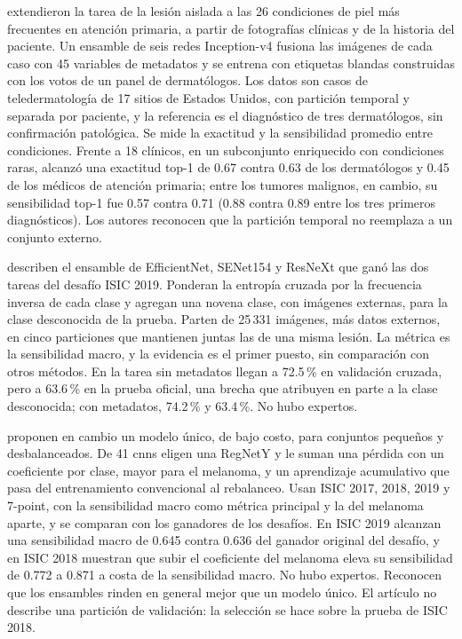 \textcite{liu2020deep} extendieron la tarea de la lesión aislada a las 26 condiciones de piel más frecuentes en
atención primaria, a partir de fotografías clínicas y de la historia del paciente. Un ensamble de seis redes
Inception-v4 fusiona las imágenes de cada caso con 45 variables de metadatos y se entrena con etiquetas blandas
construidas con los votos de un panel de dermatólogos. Los datos son casos de teledermatología de 17 sitios de
Estados Unidos, con partición temporal y separada por paciente, y la referencia es el diagnóstico de tres dermatólogos, sin confirmación
patológica. Se mide la exactitud y la sensibilidad promedio entre condiciones. Frente a 18 clínicos, en un
subconjunto enriquecido con condiciones raras, alcanzó una exactitud top-1 de 0.67 contra 0.63 de los dermatólogos y 0.45
de los médicos de atención primaria; entre los tumores malignos, en cambio, su sensibilidad top-1 fue 0.57 contra
0.71 (0.88 contra 0.89 entre los tres primeros diagnósticos). Los
autores reconocen que la partición temporal no reemplaza a un conjunto externo.

\textcite{gessert2020skin} describen el ensamble de EfficientNet, SENet154 y ResNeXt que ganó las dos tareas del
desafío ISIC 2019. Ponderan la entropía cruzada por la frecuencia inversa de cada clase y agregan una novena clase,
con imágenes externas, para la clase desconocida de la prueba. Parten de 25\,331 imágenes, más datos externos, en cinco
particiones que mantienen juntas las de una misma lesión. La métrica es la sensibilidad macro, y la evidencia es el primer puesto, sin
comparación con otros métodos. En la tarea sin metadatos llegan a 72.5\,\% en validación cruzada, pero a 63.6\,\% en la
prueba oficial, una brecha que atribuyen en parte a la clase desconocida; con metadatos, 74.2\,\% y 63.4\,\%. No hubo expertos.

\textcite{yao2022single} proponen en cambio un modelo único, de bajo costo, para conjuntos pequeños y
desbalanceados. De 41 \glspl{cnn} eligen una RegNetY y le suman una pérdida con un coeficiente por clase, mayor para
el melanoma, y un aprendizaje acumulativo que pasa del entrenamiento convencional al rebalanceo. Usan ISIC 2017, 2018,
2019 y 7-point, con la sensibilidad macro como métrica principal y la del melanoma aparte, y se comparan con los
ganadores de los desafíos. En ISIC 2019 alcanzan una sensibilidad macro de 0.645 contra 0.636 del ganador original del
desafío, y en ISIC 2018 muestran que subir el coeficiente del melanoma eleva su sensibilidad de 0.772 a 0.871 a
costa de la sensibilidad macro. No
hubo expertos. Reconocen que los ensambles rinden en general mejor que un modelo único. El artículo no describe una
partición de validación: la selección se hace sobre la prueba de ISIC 2018.

